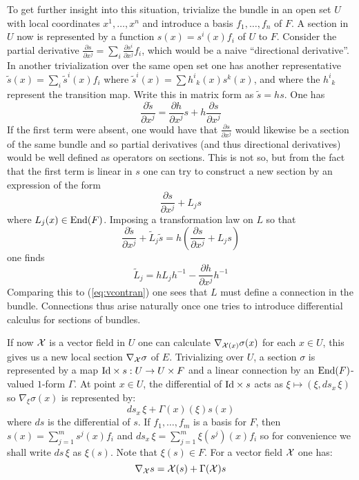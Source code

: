 \documentclass[12pt,titlepage]{article}
\def\cX{{\cal X}}
\def\End{\hbox{End}}
\def\Id{\hbox{Id}}
\begin{document}
To get further insight into this situation, trivialize the bundle in an
open set \(U\) with local coordinates \(x^1,\dots, x^n\) and introduce a
basis \(f_1,\dots,f_n\) of \(F\). A section in \(U\) now is represented
by a function \(s(x)=s^i(x)f_i\) of \(U\) to \(F\). Consider the
partial derivative \(\frac{\partial s}{\partial x^j}=
\sum_i\frac{\partial s^i}{\partial x^j}f_i\), 
which would be a naive
``directional derivative''. In another trivialization over the same open
set one has another representative \(\tilde s(x) =\sum_i\tilde s^i(x)f_i\)
 where 
\(\tilde s^i(x) = \sum h^i{}_k(x)s^k(x)\), and where the \(h^i{}_k\)
represent the transition map. Write this in matrix form 
as \(\tilde s = h s\). One has 
\[
\frac{\partial \tilde s}{\partial x^j}= \frac{\partial h}{\partial x^j}s
+h\frac{\partial s}{\partial x^j}
\]
If the first term were  absent, one would have that 
\(\frac{\partial s}{\partial x^j}\)
would likewise be a section of the same bundle and so partial
derivatives (and thus directional derivatives) would be well defined 
as operators on sections.  This is not so, but from the fact that the
first term is linear in \(s\) one can try to construct a new section
by an expression of the form 
\[
\frac{\partial s}{\partial x^j} + L_j s
\] 
where \(L_j(x) \in \End(F)\). Imposing a transformation law on
\(L\) so that 
\[
\frac{\partial \tilde s}{\partial x^j} + \tilde L_j \tilde s=
h(\frac{\partial s}{\partial x^j} + L_j s)
\] 
one finds 
\[
\tilde L_j = h L_j h^{-1} - \frac{\partial h}{\partial x^j}h^{-1}
\]
Comparing this to (\ref{eq:vcontran}) one sees that \(L\) must
define a connection in the bundle. Connections thus arise naturally once
one tries to introduce differential calculus for sections of bundles.

If now \(\cX\) is a vector field in \(U\) one can calculate
\(\nabla_{\cX(x)}\sigma(x)\) for each \(x\in U\),
this gives us a new local section \(\nabla_{\cX}\sigma\)
\index{\(\zeta_X\)@\(\nabla_{\cX}\)}%
of \(E\).
Trivializing over \(U\), a section
\(\sigma\) is represented by a map \(\Id\times s: U \to U\times F\)
and a linear connection by an \(\End(F)\)-valued  \(1\)-form
\(\Gamma\).  At point \(x\in U\), the differential of \(\Id\times s\)
acts as \(\xi \mapsto (\xi, ds_x\,\xi)\) so \(\nabla_\xi\sigma(x)\) is
represented by:
\begin{equation}%
ds_x\,\xi + \Gamma(x)(\xi)s(x)
\end{equation}%
where \(ds\) is the differential of \(s\). If \(f_1,\dots,f_m\) is a
basis for \(F\), then \(s(x)=\sum_{j=1}^ms^j(x)f_i\) and
\(ds_x\,\xi=\sum_{j=1}^m\xi(s^j)(x)f_i\) so for convenience we shall
write \(ds\,\xi\) as \(\xi(s)\). Note that \(\xi(s) \in F\). For a
vector field \(\cX\) one has:
\begin{equation}\label{eq:lincd}%
\nabla_\cX s = \cX(s) + \Gamma(\cX)s
\end{equation}%
\end{document}
